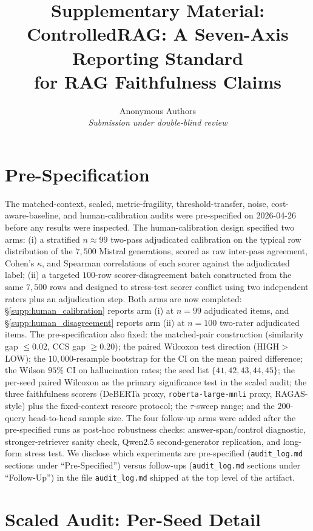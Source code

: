 \documentclass[11pt]{article}
\title{\Large\bfseries Supplementary Material:\\
ControlledRAG: A Seven-Axis Reporting Standard\\
for RAG Faithfulness Claims}
\author{Anonymous Authors\\\textit{Submission under double-blind review}}
\date{}
\begin{document}
\maketitle

\tableofcontents

\section{Pre-Specification}
\label{supp:prereg}

The matched-context, scaled, metric-fragility, threshold-transfer,
noise, cost-aware-baseline, and human-calibration audits were
pre-specified on 2026-04-26 before any results were inspected. The
human-calibration design specified two arms: (i) a stratified
$n{\approx}99$ two-pass adjudicated calibration on the typical row
distribution of the $7{,}500$ Mistral generations, scored as raw
inter-pass agreement, Cohen's $\kappa$, and Spearman correlations of
each scorer against the adjudicated label; (ii) a targeted $100$-row
scorer-disagreement batch constructed from the same $7{,}500$ rows and
designed to stress-test scorer conflict using two independent raters
plus an adjudication step. Both arms are now completed:
\S\ref{supp:human_calibration} reports arm (i) at $n=99$ adjudicated
items, and \S\ref{supp:human_disagreement} reports arm (ii) at $n=100$
two-rater adjudicated items. The pre-specification also fixed: the
matched-pair construction (similarity gap $\leq 0.02$, CCS gap
$\geq 0.20$); the paired Wilcoxon test direction (HIGH$>$LOW); the
$10{,}000$-resample bootstrap for the CI on the mean paired
difference; the Wilson $95\%$ CI on hallucination rates; the seed list
$\{41, 42, 43, 44, 45\}$; the per-seed paired Wilcoxon as the primary
significance test in the scaled audit; the three faithfulness scorers
(DeBERTa proxy, \texttt{roberta-large-mnli} proxy, RAGAS-style) plus
the fixed-context rescore protocol; the $\tau$-sweep range; and the
$200$-query head-to-head sample size. The four follow-up arms were
added after the pre-specified runs as post-hoc robustness checks:
answer-span/control diagnostic, stronger-retriever sanity check,
Qwen$2.5$ second-generator replication, and long-form stress test. We
disclose which experiments are pre-specified
(\texttt{audit\_log.md} sections under ``Pre-Specified'') versus
follow-ups (\texttt{audit\_log.md} sections under ``Follow-Up'') in
the file \texttt{audit\_log.md} shipped at the top level of the
artifact.

\section{Scaled Audit: Per-Seed Detail}
\label{supp:scaled}
\end{document}
